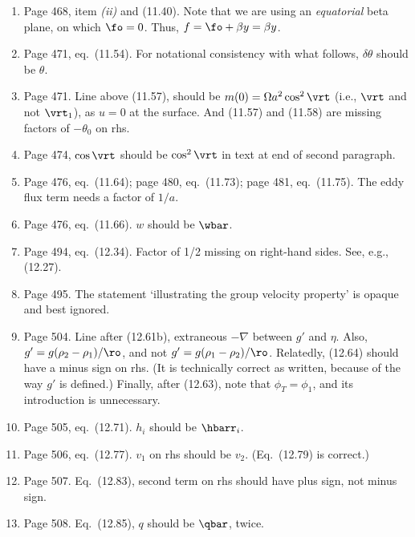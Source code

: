 \documentclass[10pt]{article}
\newcommand{\eq}{eq.\ } \newcommand{\Eq}{Eq.\ }
\begin{document}
\begin{enumerate}
\item Page 468, item \textit{(ii)} and (11.40). Note that we are using an \textit{equatorial} beta plane, on which $\fo=0$. Thus, $f=\fo + \beta y = \beta y$.

\item Page  471, \eq (11.54). For notational consistency with what follows, $\delta \theta$ should be $\theta$. 

\item Page 471. Line above (11.57), should be $m(0) = \Omega a^2 \cos^2 \vrt$ (i.e., $\vrt$ and not $\vrt_1$), as $u=0$ at the surface. And (11.57) and (11.58) are missing factors of $-\theta_0$ on rhs.

\item Page 474, $\cos \vrt$ should be $\cos^2 \vrt$ in text at end of second paragraph.

\item Page 476, \eq (11.64); page 480, \eq (11.73);  page 481, \eq(11.75). The eddy flux term needs a factor of $1/a$.

\item Page 476, \eq (11.66). $w$ should be $\wbar$.

 \item Page 494, \eq (12.34). Factor of 1/2 missing on right-hand sides. See, e.g., (12.27). 

 \item Page 495. The statement `illustrating the group velocity property' is opaque and best ignored. 

\item Page 504. Line after (12.61b), extraneous $-\nabla$ between $g'$ and $\eta$. Also, $g' = g (\rho_2-\rho_1)/\ro$, and not $g' = g (\rho_1-\rho_2)/\ro$. Relatedly, (12.64) should have a minus sign on rhs. (It is technically correct as written, because of the way $g'$ is defined.) Finally, after (12.63), note that $\phi_T = \phi_1$, and its introduction is unnecessary.

\item Page 505, \eq(12.71). $h_i$ should be $\hbarr_i$. 

\item Page 506, \eq (12.77). $v_1$ on rhs should be $v_2$. (Eq.\ (12.79) is correct.) 

\item Page 507. \Eq (12.83), second term on rhs should have plus sign, not minus sign.

\item Page 508. \Eq (12.85), $q$ should be $\qbar$, twice.


\end{enumerate}
\end{document}
